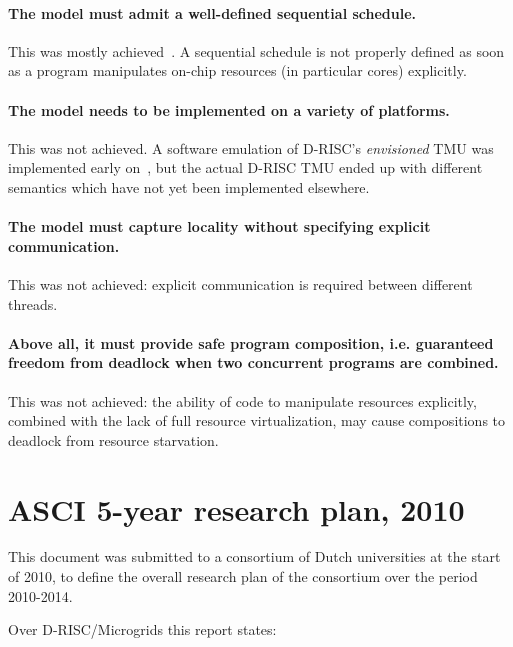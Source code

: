 \paragraph{The model must admit a well-defined sequential schedule.}
This was mostly achieved~\cite[Chap.~10]{poss.12}. A sequential schedule is not properly defined
as soon as a program manipulates on-chip resources (in particular cores) explicitly.

\paragraph{The model needs to be implemented on a variety of platforms.} This was not achieved. 
A software emulation of D-RISC's \emph{envisioned} TMU was implemented early on~\cite{tol.09.jsa}, but
the actual D-RISC TMU ended up with different semantics which have not yet been implemented elsewhere.

\paragraph{The model must capture locality without specifying explicit communication.}
This was not achieved: explicit communication is required between different threads.

\paragraph{Above all, it must provide safe program composition, i.e. guaranteed freedom from deadlock
when two concurrent programs are combined.}
This was not achieved: the ability of code to manipulate resources explicitly, combined with the lack
of full resource virtualization, may cause compositions to deadlock from resource starvation. 

\section{ASCI 5-year research plan, 2010}

This document was submitted to a consortium of Dutch universities
at the start of 2010, to define the overall research plan of the consortium
over the period 2010-2014.

Over D-RISC/Microgrids this report states:

